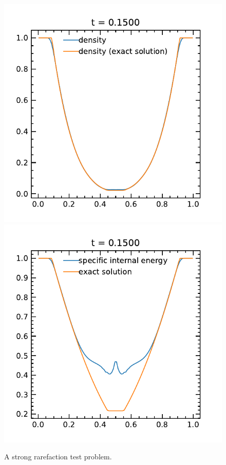 \documentclass[fleqn,usenatbib]{mnras}
\begin{document}
\begin{figure}
    \includegraphics[width=\columnwidth]{hydro_vacuum_0.1500.pdf}
    \includegraphics[width=\columnwidth]{hydro_vacuum_eint_0.1500.pdf}
    \caption{A strong rarefaction test problem.}
    \label{fig:vacuum}
\end{figure}
\end{document}
